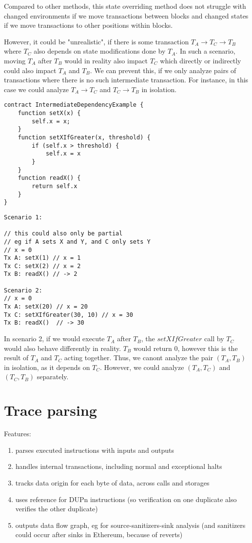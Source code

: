 \documentclass[draft,final]{vutinfth} %
\begin{document}
Compared to other methods, this state overriding method does not struggle with changed environments if we move transactions between blocks and changed states if we move transactions to other positions within blocks.

However, it could be "unrealistic", if there is some transaction $T_A \rightarrow T_C \rightarrow T_B$ where $T_C$ also depends on state modifications done by $T_A$. In such a scenario, moving $T_A$ after $T_B$ would in reality also impact $T_C$ which directly or indirectly could also impact $T_A$ and $T_B$. We can prevent this, if we only analyze pairs of transactions where there is no such intermediate transaction. For instance, in this case we could analyze $T_A \rightarrow T_C$ and $T_C \rightarrow T_B$ in isolation.

\begin{verbatim}
contract IntermediateDependencyExample {
    function setX(x) {
        self.x = x;
    }
    function setXIfGreater(x, threshold) {
        if (self.x > threshold) {
            self.x = x
        }
    }
    function readX() {
        return self.x
    }
}
\end{verbatim}

\begin{verbatim}
Scenario 1:

// this could also only be partial
// eg if A sets X and Y, and C only sets Y
// x = 0
Tx A: setX(1) // x = 1
Tx C: setX(2) // x = 2
Tx B: readX() // -> 2

Scenario 2:
// x = 0
Tx A: setX(20) // x = 20
Tx C: setXIfGreater(30, 10) // x = 30
Tx B: readX()  // -> 30
\end{verbatim}

In scenario 2, if we would execute $T_A$ after $T_B$, the $setXIfGreater$ call by $T_C$ would also behave differently in reality. $T_B$ would return $0$, however this is the result of $T_A$ and $T_C$ acting together. Thus, we canont analyze the pair $(T_A, T_B)$ in isolation, as it depends on $T_C$. However, we could analyze $(T_A, T_C)$ and $(T_C, T_B)$ separately.

\section{Trace parsing}

Features:

\begin{enumerate}
    \item parses executed instructions with inputs and outputs
    \item handles internal transactions, including normal and exceptional halts
    \item tracks data origin for each byte of data, across calls and storages
    \item uses reference for DUPn instructions (so verification on one duplicate also verifies the other duplicate)
    \item outputs data flow graph, eg for source-sanitizers-sink analysis (and sanitizers could occur after sinks in Ethereum, because of reverts)
\end{enumerate}
\end{document}
